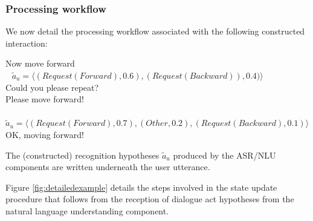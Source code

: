 \subsubsection*{Processing workflow}

We now detail the processing workflow associated with the following constructed interaction:
\begin{dialogue} 
 Now move forward \\ $\phantom{b}$ $\tilde{a}_u = \langle (\mathit{Request(Forward)}, 0.6), (\mathit{Request(Backward)}), 0.4)\rangle$  \\[-3mm]
 Could you please repeat? \\[-3mm]
 Please move forward! \\ $\phantom{b}$ $\tilde{a}_u = \langle (\mathit{Request(Forward)}, 0.7), (\mathit{Other}, 0.2), (\mathit{Request(Backward)}, 0.1) \rangle$ \\[-3mm]
 OK, moving forward!
\end{dialogue}
The (constructed) recognition hypotheses $\tilde{a}_u$ produced by the ASR/NLU components are written underneath the user utterance. 

Figure \ref{fig:detailedexample} details the steps involved in the state update procedure that follows from the reception of dialogue act hypotheses from the natural language understanding component. 


